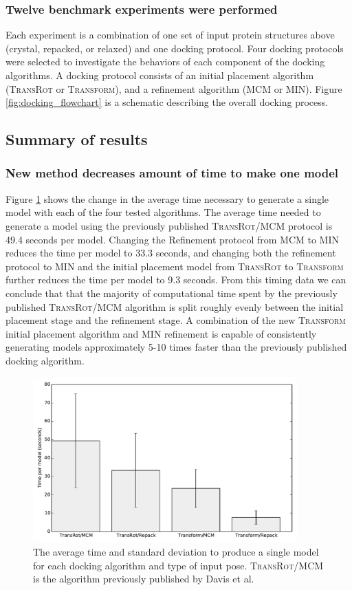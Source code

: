 \subsubsection{Twelve benchmark experiments were performed}
Each experiment is a combination of one set of input protein structures above (crystal, repacked, or relaxed) and one docking protocol.
Four docking protocols were selected to investigate the behaviors of each component of the docking algorithms.
A docking protocol consists of an initial placement algorithm (\textsc{TransRot} or \textsc{Transform}), and a refinement algorithm (MCM or MIN).
Figure \ref{fig:docking_flowchart} is a schematic describing the overall docking process. 

\subsection{Summary of results}
\subsubsection{New method decreases amount of time to make one model}
Figure \ref{fig:time_per_model} shows the change in the average time necessary to generate a single model with each of the four tested algorithms.
The average time needed to generate a model using the previously published \textsc{TransRot}/MCM protocol is 49.4 seconds per model.
Changing the Refinement protocol from MCM to MIN reduces the time per model to 33.3 seconds, and changing both the refinement protocol to MIN and the initial placement model from \textsc{TransRot} to \textsc{Transform} further reduces the time per model to 9.3 seconds.
From this timing data we can conclude that that the majority of computational time spent by the previously published \textsc{TransRot}/MCM algorithm is split roughly evenly between the initial placement stage and the refinement stage.
A combination of the new \textsc{Transform} initial placement algorithm and MIN refinement is capable of consistently generating models approximately 5-10 times faster than the previously published docking algorithm.

\begin{figure}
\centering
\includegraphics[width=4in]{figures/lowres/time_per_model.pdf}
\caption{
The average time and standard deviation to produce a single model for each docking algorithm and type of input pose.
\textsc{TransRot}/MCM is the algorithm previously published by Davis et al\citep{Davis:2009bf}. 
}
\label{fig:time_per_model}
\end{figure}


